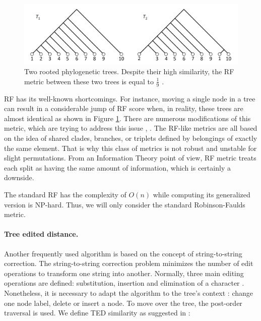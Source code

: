 
\begin{figure}[H]
	\includegraphics[width=1\textwidth,keepaspectratio=true]{figures/RF_shortcommings1.png}
	\centering
	\caption{Two rooted phylogenetic trees. Despite their high similarity, the RF metric between these two trees is equal to $\frac{1}{9}$ \cite{RF2013}.}
	\label{fig:rf_shortcommings}
\end{figure}

RF has its well-known shortcomings. For instance, moving a single node in a tree can result in a considerable jump of RF score when, in reality, these trees are almost identical as shown in Figure \ref{fig:rf_shortcommings}. 
There are numerous modifications of this metric, which are trying to address this issue \cite{Kuhner1994}, \cite{Critchlow1996}. The RF-like metrics are all based on the idea of shared clades, branches, or triplets \cite{Kuhner2014} defined by belongings of exactly the same element. That is why this class of metrics is not robust and unstable for slight permutations. From an Information Theory point of view, RF metric treats each split as having the same amount of information, which is certainly a downside. 

The standard RF has the complexity of $O(n)$ while computing its generalized version is NP-hard. Thus, we will only consider the standard Robinson-Faulds metric. 



\paragraph{Tree edited distance.} \label{zss_metric}
Another frequently used algorithm is based on the concept of string-to-string correction. 
The string-to-string correction problem minimizes the number of edit operations to transform one string into another. Normally, three main editing operations are defined: substitution, insertion and elimination of a character \cite{Barnard95tree-to-treecorrection}. Nonetheless, it is necessary to adapt the algorithm to the tree's context \cite{Zhang1989}: change one node label, delete or insert a node. To move over the tree, the post-order traversal is used. 
We define TED similarity as suggested in \cite{RicoJuan2003ComparisonOA}:

